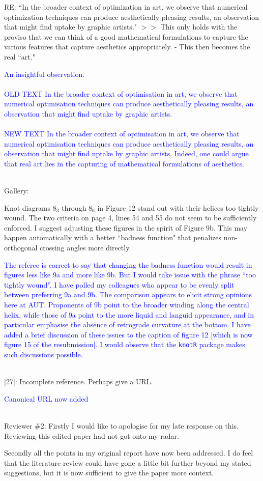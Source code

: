 \documentclass[12pt]{article}
\begin{document}
RE: ``In the broader context of optimization in art, we observe that
numerical optimization techniques can produce aesthetically pleasing
results, an observation that might find uptake by graphic artists."
$>>$ This only holds with the proviso that we can think of a good
mathematical formulations to capture the various features that capture
aesthetics appropriately.  - This then becomes the real ``art."

\textcolor{blue}{ An insightful observation.\\ \\ OLD TEXT In the
  broader context of optimisation in art, we observe that numerical
  optimisation techniques can produce aesthetically pleasing results,
  an observation that might find uptake by graphic artists.\\ \\ NEW
  TEXT In the broader context of optimisation in art, we observe that
  numerical optimisation techniques can produce aesthetically pleasing
  results, an observation that might find uptake by graphic artists.
  Indeed, one could argue that real art lies in the capturing of
  mathematical formulations of aesthetics.  \\ \\ }


Gallery:

Knot diagrams $8_3$ through $8_6$ in Figure 12 stand out with their helices
too tightly wound.  The two criteria on page 4, lines 54 and 55 do not
seem to be sufficiently enforced.  I suggest adjusting these figures
in the spirit of Figure 9b.  This may happen automatically with a
better ``badness function" that penalizes non-orthogonal crossing
angles more directly.

\textcolor{blue}{The referee is correct to say that changing the
  badness function would result in figures less like 9a and more like
  9b.  But I would take issue with the phrase ``too tightly wound''.
  I have polled my colleagues who appear to be evenly split between
  preferring 9a and 9b.  The comparison appears to elicit strong
  opinions here at AUT.  Proponents of 9b point to the broader winding
  along the central helix, while those of 9a point to the more liquid
  and languid appearance, and in particular emphasise the absence of
  retrograde curvature at the bottom.  I have added a brief discussion
  of these issues to the caption of figure 12 [which is now figure 15
    of the resubmission].  I would observe that the {\tt knotR}
  package makes such discussions possible.\\ \\}

[27]:  Incomplete reference.  Perhaps give a URL.

\textcolor{blue}{Canonical URL now added\\ \\}


Reviewer \#2: Firstly I would like to apologise for my late response on
this. Reviewing this edited paper had not got onto my radar.

Secondly all the points in my original report have now been
addressed. I do feel that the literature review could have gone a
little bit further beyond my stated suggestions, but it is now
sufficient to give the paper more context.
\end{document}
